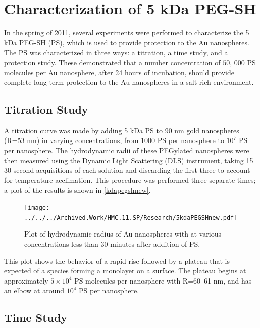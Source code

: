 
\def\mytitle{Chapter 2 -- DLS Studies and Protocol Optimization}

\def\bibliocommand{}
\chapter{Characterization of 5 kDa PEG-SH}
\label{characterizationof5kdapeg-sh}

In the spring of 2011, several experiments were performed to characterize the 5 kDa PEG-SH (PS), which is used to provide protection to the Au nanospheres. The PS was characterized in three ways: a titration, a time study, and a protection study. These demonstrated that a number concentration of $50,\,000$ PS molecules per Au nanosphere, after 24 hours of incubation, should provide complete long-term protection to the Au nanospheres in a salt-rich environment.

\section{Titration Study}
\label{titrationstudy}

A titration curve was made by adding 5 kDa PS to 90 nm gold nanospheres (R=53 nm) in varying concentrations, from 1000 PS per nanosphere to $10^7$ PS per nanosphere. The hydrodynamic radii of these PEGylated nanospheres were then measured using the Dynamic Light Scattering (DLS) instrument, taking 15 30-second acquisitions of each solution and discarding the first three to account for temperature acclimation. This procedure was performed three separate times; a plot of the results is shown in \autoref{kdapegshnew}.

\begin{figure}[htbp]
\centering
\texttt{[image: ../../../Archived.Work/HMC.11.SP/Research/5kdaPEGSHnew.pdf]}
\caption{Plot of hydrodynamic radius of Au nanospheres with at various concentrations less than 30 minutes after addition of PS.}
\label{kdapegshnew}
\end{figure}



This plot shows the behavior of a rapid rise followed by a plateau that is expected of a species forming a monolayer on a surface. The plateau begins at approximately $5\times10^4$ PS molecules per nanosphere with R=60--61 nm, and has an elbow at around $10^4$ PS per nanosphere.

\section{Time Study}
\label{timestudy}

